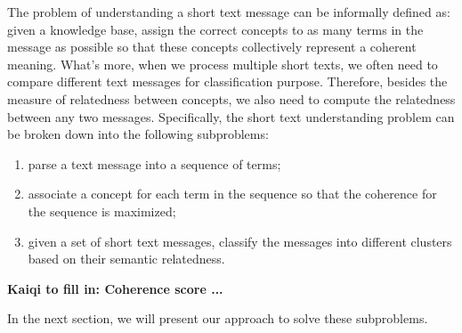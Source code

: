 The problem of understanding a short text message can be informally 
defined as: given a knowledge base, 
assign the correct concepts to as many terms in the message 
as possible so that these concepts collectively represent a coherent meaning. 
What's more, when we process multiple short texts, we often need to compare 
different text messages for classification purpose. Therefore, besides the 
measure of relatedness between concepts, we also need to compute the
relatedness between any two messages. Specifically, the short text
understanding problem can be broken down into the following
subproblems:

\begin{enumerate}
\item parse a text message into a sequence of terms;

\item associate a concept for each term in the sequence so that the coherence
for the sequence is maximized;

\item given a set of short text messages, classify the messages into different
clusters based on their semantic relatedness. 

\end{enumerate}

{\bf 
Kaiqi to fill in: Coherence score ...
}

In the next section, we will present our approach to solve these subproblems.

